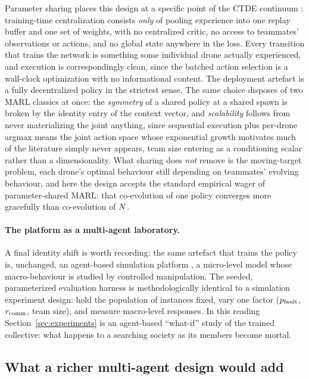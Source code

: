 Parameter sharing \citep{gupta2017cooperative} places this design at a specific
point of the CTDE continuum \citep{kraemer2016multi,lowe2017multi}: training-time
centralization consists \emph{only} of pooling experience into one replay buffer
and one set of weights, with no centralized critic, no access to teammates'
observations or actions, and no global state anywhere in the loss. Every
transition that trains the network is something some individual drone actually
experienced, and execution is correspondingly clean, since the batched action
selection is a wall-clock optimization with no informational content. The
deployment artefact is a fully decentralized policy in the strictest sense. The
same choice disposes of two MARL classics at once: the \emph{symmetry} of a
shared policy at a shared spawn is broken by the identity entry of the context
vector, and \emph{scalability} follows from never materializing the joint
anything, since sequential execution plus per-drone argmax means the joint action
space whose exponential growth motivates much of the literature simply never
appears, team size entering as a conditioning scalar rather than a
dimensionality. What sharing does \emph{not} remove is the moving-target problem,
each drone's optimal behaviour still depending on teammates' evolving behaviour,
and here the design accepts the standard empirical wager of parameter-shared
MARL: that co-evolution of one policy converges more gracefully than co-evolution
of $N$.

\paragraph{The platform as a multi-agent laboratory.}
A final identity shift is worth recording: the same artefact that trains the
policy is, unchanged, an agent-based simulation platform
\citep{bonabeau2002agent}, a micro-level model whose macro-behaviour is studied
by controlled manipulation. The seeded, parameterized evaluation harness is
methodologically identical to a simulation experiment design: hold the population
of instances fixed, vary one factor ($p_{\mathrm{fault}}$, $r_{\mathrm{comm}}$, team size), and measure
macro-level responses. In this reading Section~\ref{sec:experiments} is an
agent-based ``what-if'' study of the trained collective: what happens to a
searching society as its members become mortal.

\subsection{What a richer multi-agent design would add}
\label{subsec:mas-beyond}

